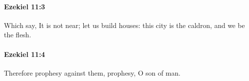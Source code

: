 		\paragraph{Ezekiel 11:3} %
			\label{EZEKIEL-11-3}

			Which say, It is not near; let us build houses: this city is the caldron, and we be the flesh.


		\paragraph{Ezekiel 11:4} %
			\label{EZEKIEL-11-4}

			Therefore prophesy against them, prophesy, O son of man.


